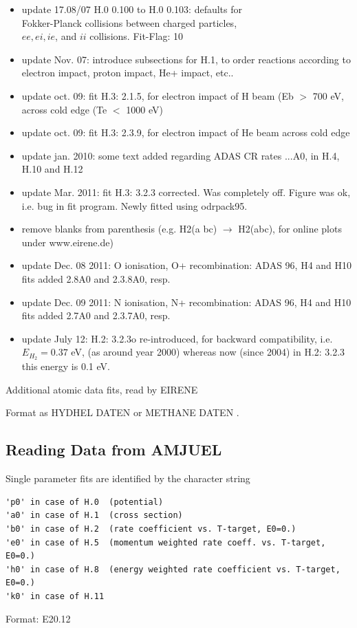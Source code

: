 \documentclass[12pt,dvips]{article}
\begin{document}
\begin{itemize}
  to be done: H.10 2.1.8 H.12 2.1.8de  (JH to be replaced by FU)
  \item update   17.08/07  H.0 0.100 to H.0 0.103: defaults for \\
  Fokker-Planck collisions between charged particles,\\
  $ee, ei, ie$, and $ii$ collisions. Fit-Flag: 10
  \item update Nov. 07:  introduce subsections for H.1, to order
  reactions according to electron impact, proton impact, He+ impact, etc..
  \item update oct. 09:  fit H.3: 2.1.5, for electron impact
  of H beam (Eb $>$ 700 eV, across cold edge (Te $<$ 1000 eV)
  \item update oct. 09:  fit H.3: 2.3.9, for electron impact
  of He beam across cold edge
  \item update jan. 2010: some text added regarding ADAS CR rates
  ...A0, in H.4, H.10 and H.12
  \item update Mar. 2011:  fit H.3: 3.2.3 corrected. Was completely off.
  Figure was ok, i.e. bug in fit program. Newly fitted using odrpack95.
  \item remove blanks from parenthesis (e.g. H2(a bc) $\rightarrow$ H2(abc), for online plots under www.eirene.de)
  \item update Dec. 08 2011:  O ionisation, O+ recombination: ADAS 96, H4 and H10 fits added 2.8A0 and 2.3.8A0, resp.
  \item update Dec. 09 2011:  N ionisation, N+ recombination: ADAS 96, H4 and H10 fits added 2.7A0 and 2.3.7A0, resp.
  \item update July 12:  H.2: 3.2.3o re-introduced, for backward compatibility, i.e. $E_{H_2}=0.37$ eV, (as around year 2000) 
  whereas now (since 2004) in  H.2: 3.2.3 this energy is 0.1 eV.  
\end{itemize}
\newpage
Additional atomic data fits, read by EIRENE

Format as HYDHEL DATEN \cite{kn:Janev}
or METHANE DATEN \cite{kn:Ehrhardt}.
\newpage

\subsection*{Reading Data from AMJUEL}
Single parameter fits are identified by the character string
\begin{small}\begin{verbatim}
'p0' in case of H.0  (potential)
'a0' in case of H.1  (cross section)
'b0' in case of H.2  (rate coefficient vs. T-target, E0=0.)
'e0' in case of H.5  (momentum weighted rate coeff. vs. T-target, E0=0.)
'h0' in case of H.8  (energy weighted rate coefficient vs. T-target, E0=0.)
'k0' in case of H.11
\end{verbatim}\end{small}
Format: E20.12
\end{document}
